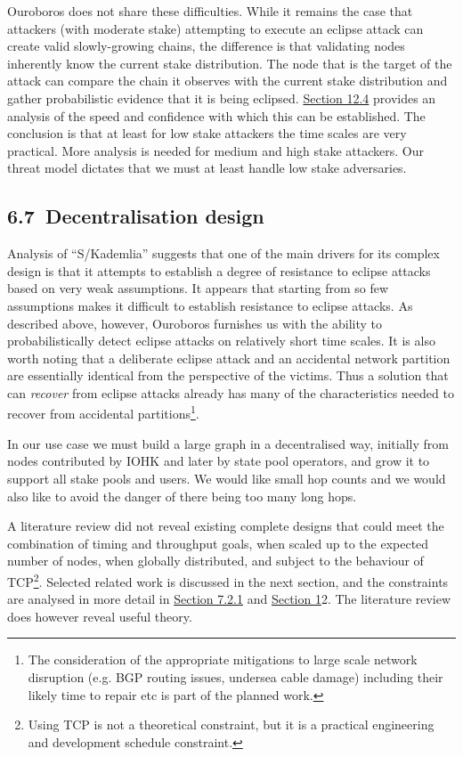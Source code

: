 \documentclass[]{article}
\begin{document}
Ouroboros does not share these difficulties. While it remains the case
that attackers (with moderate stake) attempting to execute an eclipse
attack can create valid slowly-growing chains, the difference is that
validating nodes inherently know the current stake distribution. The
node that is the target of the attack can compare the chain it observes
with the current stake distribution and gather probabilistic evidence
that it is being eclipsed.
\protect\hyperlink{performance-model-of-ouroboros-praos}{{Section 12.4}}
provides an analysis of the speed and confidence with which this can be
established. The conclusion is that at least for low stake attackers the
time scales are very practical. More analysis is needed for medium and
high stake attackers. Our threat model dictates that we must at least
handle low stake adversaries.

\hypertarget{decentralisation-design}{%
\subsection{​6.7​~Decentralisation
design}\label{decentralisation-design}}

Analysis of ``S/Kademlia'' suggests that one of the main drivers for its
complex design is that it attempts to establish a degree of resistance
to eclipse attacks based on very weak assumptions. It appears that
starting from so few assumptions makes it difficult to establish
resistance to eclipse attacks. As described above, however, Ouroboros
furnishes us with the ability to probabilistically detect eclipse
attacks on relatively short time scales. It is also worth noting that a
deliberate eclipse attack and an accidental network partition are
essentially identical from the perspective of the victims. Thus a
solution that can \emph{recover} from eclipse attacks already has many
of the characteristics needed to recover from accidental
partitions\footnote{The consideration of the appropriate mitigations to
  large scale network disruption (e.g. BGP routing issues, undersea
  cable damage) including their likely time to repair etc is part of the
  planned work.}.

In our use case we must build a large graph in a decentralised way,
initially from nodes contributed by IOHK and later by state pool
operators, and grow it to support all stake pools and users. We would
like small hop counts and we would also like to avoid the danger of
there being too many long hops.

A literature review did not reveal existing complete designs that could
meet the combination of timing and throughput goals, when scaled up to
the expected number of nodes, when globally distributed, and subject to
the behaviour of TCP\footnote{Using TCP is not a theoretical constraint,
  but it is a practical engineering and development schedule constraint.}.
Selected related work is discussed in the next section, and the
constraints are analysed in more detail in
\protect\hyperlink{timeliness-constraint}{{Section 7.2.1}} and
\protect\hyperlink{annexes}{{Section 1}}2. The literature review does
however reveal useful theory.
\end{document}
